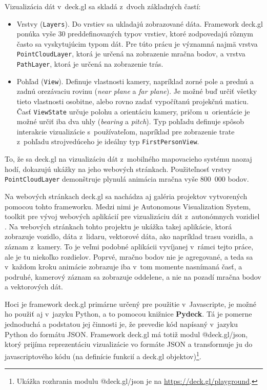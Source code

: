Vizualizácia dát v~deck.gl sa skladá z~dvoch základných častí:
\begin{itemize}
    \item Vrstvy (\texttt{Layers}). Do vrstiev sa ukladajú zobrazované dáta. Framework deck.gl ponúka vyše 30 preddefinovaných typov vrstiev, ktoré zodpovedajú rôznym často sa vyskytujúcim typom dát. Pre túto prácu je významná najmä vrstva \texttt{PointCloudLayer}, ktorá je určená na zobrazenie mračna bodov, a vrstva \texttt{PathLayer}, ktorá je určená na zobrazenie trás.
    \item Pohľad (\texttt{View}). Definuje vlastnosti kamery, napríklad zorné pole a prednú a zadnú orezávaciu rovinu (\emph{near plane} a \emph{far plane}). Je možné buď určiť všetky tieto vlastnosti osobitne, alebo rovno zadať vypočítanú projekčnú maticu.
    Časť \texttt{ViewState} určuje polohu a orientáciu kamery, pričom u~orientácie je možné určiť iba dva uhly (\emph{bearing} a \emph{pitch}). Typ pohľadu definuje spôsob interakcie vizualizácie s~používateľom, napríklad pre zobrazenie trate z~pohľadu strojvedúceho je ideálny typ \texttt{FirstPersonView}.
\end{itemize}

To, že sa deck.gl na vizualizáciu dát z~mobilného mapovacieho systému naozaj hodí, dokazujú ukážky na jeho webových stránkach. Použiteľnosť vrstvy \texttt{PointCloudLayer} demonštruje plynulá animácia mračna vyše 800~000 bodov.

Na webových stránkach deck.gl sa nachádza aj galéria projektov vytvorených pomocou tohto frameworku. Medzi nimi je Autonomous Visualization System, toolkit pre vývoj webových aplikácií pre vizualizáciu dát z~autonómnych vozidiel \cite{avs}. Na webových stránkach tohto projektu je ukážka takej aplikácie, ktorá zobrazuje vozidlo, dáta z~lidaru, vektorové dáta, ako napríklad trasu vozidla, a záznam z~kamery. To je veľmi podobné aplikácii vyvíjanej v~rámci tejto práce, ale je tu niekoľko rozdielov. Poprvé, mračno bodov nie je agregované, a teda sa v~každom kroku animácie zobrazuje iba v~tom momente nasnímaná časť, a podruhé, kamerový záznam sa zobrazuje oddelene, a nie na pozadí mračna bodov a vektorových dát.

Hoci je framework deck.gl primárne určený pre použitie v~Javascripte, je možné ho použiť aj v~jazyku Python, a to pomocou knižnice \textbf{Pydeck}. Tá je pomerne jednoduchá a podstatou jej činnosti je, že prevedie kód napísaný v~jazyku Python do formátu JSON. Framework deck.gl má totiž modul @deck.gl/json, ktorý prijíma reprezentáciu vizualizácie vo formáte JSON a transformuje ju do javascriptového kódu (na definície funkcií a deck.gl objektov)\footnote{Ukážka rozhrania modulu @deck.gl/json je na \url{https://deck.gl/playground}.}.

